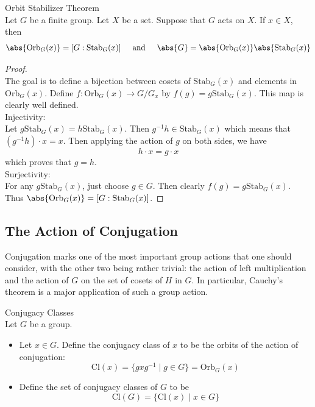 \documentclass[a4paper]{article}
\begin{document}
\begin{thm}{Orbit Stabilizer Theorem}{}\\
Let $G$ be a finite group. Let $X$ be a set. Suppose that $G$ acts on $X$. If $x\in X$, then $$\abs{\text{Orb}_G(x)}=[G:\text{Stab}_G(x)]\;\;\;\;\text{ and }\;\;\;\;\abs{G}=\abs{\text{Orb}_G(x)}\abs{\text{Stab}_G(x)}$$ 
\begin{proof}\\
The goal is to define a bijection between cosets of $\text{Stab}_G(x)$ and elements in $\text{Orb}_G(x)$. Define $f:\text{Orb}_G(x)\to G/G_x$ by $f(g)=g\text{Stab}_G(x)$. This map is clearly well defined. \\
Injectivity: \\
Let $g\text{Stab}_G(x)=h\text{Stab}_G(x)$. Then $g^{-1}h\in\text{Stab}_G(x)$ which means that $(g^{-1}h)\cdot x=x$. Then applying the action of $g$ on both sides, we have $$h\cdot x=g\cdot x$$ which proves that $g=h$. \\
Surjectivity: \\
For any $g\text{Stab}_G(x)$, just choose $g\in G$. Then clearly $f(g)=g\text{Stab}_G(x)$. \\
Thus $\abs{\text{Orb}_G(x)}=[G:\text{Stab}_G(x)]$. 
\end{proof}
\end{thm}

\subsection{The Action of Conjugation}
Conjugation marks one of the most important group actions that one should consider, with the other two being rather trivial: the action of left multiplication and the action of $G$ on the set of cosets of $H$ in $G$. In particular, Cauchy's theorem is a major application of such a group action. 

\begin{defn}{Conjugacy Classes}{}\\
Let $G$ be a group. 
\begin{itemize}
\item Let $x\in G$. Define the conjugacy class of $x$ to be the orbits of the action of conjugation: $$\text{Cl}(x)=\{gxg^{-1}\;|\;g\in G\}=\text{Orb}_G(x)$$
\item Define the set of conjugacy classes of $G$ to be $$\text{Cl}(G)=\{\text{Cl}(x)\;|\;x\in G\}$$
\end{itemize}
\end{defn}
\end{document}
